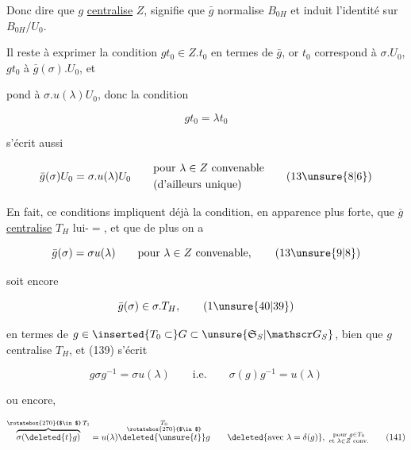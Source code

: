 Donc dire que $g$ \uline{centralise} $Z$, signifie que $\bar g$ normalise $B_{0H}$ et induit l'identité sur $B_{0H}/U_0$.

Il reste à exprimer la condition $gt_0\in Z.t_0$ en termes de $\bar g$, or  $t_0$ correspond à $\sigma.U_0$, $gt_0$ à $\bar g(\sigma).U_0$, et  



pond à $\sigma.u(\lambda)U_0$, donc la condition

\[gt_0=\lambda t_0\]

s'écrit aussi

\[\bar g(\sigma)U_0=\sigma.u(\lambda)U_0\qquad\begin{aligned}&\text{pour }\lambda\in Z\text{ convenable}\\&\text{(d'ailleurs unique)}\end{aligned}\tag*{(13\unsure{8|6})}\]

En fait, ce conditions impliquent déjà la condition, en apparence plus forte, que $\bar g$  \uline{centralise} $T_H$ lui-$=$, et que de plus on a

\[\bar g(\sigma)=\sigma u(\lambda)\qquad\text{pour }\lambda\in Z\text{ convenable},\tag*{(13\unsure{9|8})}\]

soit encore

\[\bar g(\sigma)\in\sigma.T_H,\tag*{(1\unsure{40|39})}\]

  en termes de $g\in\inserted{T_0\subset}G\subset\unsure{\mathfrak S_S|\mathscr G_S}$,   bien que $g$ centralise $T_H$, et (139) s'écrit 

\[g\sigma g^{-1}=\sigma u(\lambda)\qquad\text{i.e.}\qquad\sigma(g)g^{-1}=u(\lambda)\]

ou encore, 

\[\overbrace{\sigma(\deleted{t}g)}^{\rotatebox{270}{$\in$}\, T_1}=u(\lambda)\overset{\substack{T_0\\\rotatebox{270}{$\in$}}}{\deleted{\unsure{t}}g}\qquad \deleted{\text{avec }\lambda=\delta(g)},\ \substack{\text{pour }g\in T_0\\\text{et }\lambda\in Z\text{ conv.}}\tag*{(141)}\]

